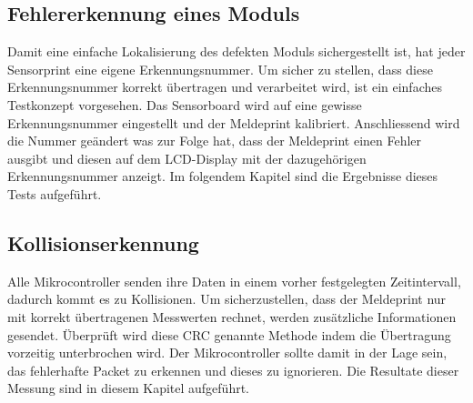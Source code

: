\subsection{Fehlererkennung eines Moduls}
Damit eine einfache Lokalisierung des defekten Moduls sichergestellt ist, hat jeder Sensorprint eine eigene Erkennungsnummer. Um sicher zu stellen, dass diese Erkennungsnummer korrekt übertragen und verarbeitet wird, ist ein einfaches Testkonzept vorgesehen. Das Sensorboard wird auf eine gewisse Erkennungsnummer eingestellt und der Meldeprint kalibriert. Anschliessend wird die Nummer geändert was zur Folge hat, dass der Meldeprint einen Fehler ausgibt und diesen auf dem LCD-Display mit der dazugehörigen Erkennungsnummer anzeigt. Im folgendem Kapitel sind die Ergebnisse dieses Tests aufgeführt.
\subsection{Kollisionserkennung}
Alle Mikrocontroller senden ihre Daten in einem vorher festgelegten Zeitintervall, dadurch kommt es zu Kollisionen. Um sicherzustellen, dass der Meldeprint nur mit korrekt übertragenen Messwerten rechnet, werden zusätzliche Informationen gesendet. Überprüft wird diese CRC genannte Methode indem die Übertragung vorzeitig unterbrochen wird. Der Mikrocontroller sollte damit in der Lage sein, das fehlerhafte Packet zu erkennen und dieses zu ignorieren. Die Resultate dieser Messung sind in diesem Kapitel aufgeführt.
